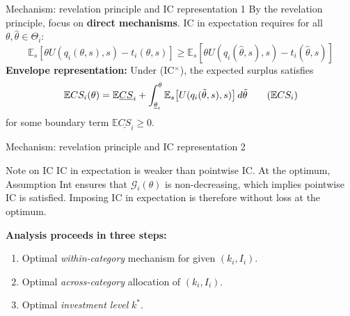 \documentclass[10pt, aspectratio=169]{beamer}
\newcommand{\E}{\mathbb{E}}
\newcommand{\G}{\mathcal{G}}
\begin{document}
\begin{frame}{Mechanism: revelation principle and IC representation 1}
By the revelation principle, focus on \textbf{direct mechanisms}. IC in expectation requires for all $\theta, \hat{\theta} \in \Theta_i$:
\[ \E_s\!\left[\theta U(q_i(\theta,s),s) - t_i(\theta,s)\right] \geq \E_s\!\left[\theta U(q_i(\hat{\theta},s),s) - t_i(\hat{\theta},s)\right] \tag{IC$^\times$} \]
\vspace{0.2cm}
\textbf{Envelope representation:} Under (IC$^\times$), the expected surplus satisfies
\[ \E CS_i(\theta) = \E\underline{CS}_i + \int_{\underline{\theta}_i}^{\theta} \E_s\!\left[U(q_i(\tilde{\theta},s),s)\right] d\tilde{\theta} \tag{$\E CS_i$} \]
for some boundary term $\E\underline{CS}_i \geq 0$.

\end{frame}

\begin{frame}{Mechanism: revelation principle and IC representation 2}

\vspace{0.2cm}
\begin{alertblock}{Note on IC}
IC in expectation is weaker than pointwise IC. At the optimum, Assumption Int ensures that $\G_i(\theta)$ is non-decreasing, which implies pointwise IC is satisfied. Imposing IC in expectation is therefore without loss at the optimum.
\end{alertblock}
\vspace{0.2cm}
\textbf{Analysis proceeds in three steps:}
\begin{enumerate}
\item Optimal \emph{within-category} mechanism for given $(k_i, I_i)$.
\item Optimal \emph{across-category} allocation of $(k_i, I_i)$.
\item Optimal \emph{investment level} $k^\ast$.
\end{enumerate}
\end{frame}
\end{document}
